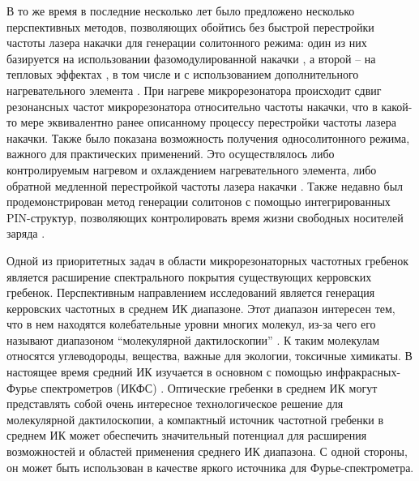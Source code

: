В то же время в последние несколько лет было предложено несколько перспективных методов, позволяющих обойтись без быстрой перестройки частоты лазера накачки для генерации солитонного режима: один из них базируется на использовании фазомодулированной накачки \cite{Taheri2015,Jang2015ol}, а второй – на тепловых эффектах \cite{Kobatake2016}, в том числе и с использованием дополнительного нагревательного элемента \cite{Joshi2016}. При нагреве микрорезонатора происходит сдвиг резонансных частот микрорезонатора относительно частоты накачки, что в какой-то мере эквивалентно ранее описанному процессу перестройки частоты лазера накачки. Также было показана возможность получения односолитонного режима, важного для практических применений. Это осуществлялось либо контролируемым нагревом и охлаждением нагревательного элемента, либо обратной медленной перестройкой частоты лазера накачки \cite{Karpov2017}. Также недавно был продемонстрирован метод генерации солитонов с помощью интегрированных PIN-структур, позволяющих контролировать время жизни свободных носителей заряда \cite{Yu2016}.

Одной из приоритетных задач в области микрорезонаторных частотных гребенок является расширение спектрального покрытия существующих керровских гребенок. Перспективным направлением исследований является генерация керровских частотных в среднем ИК диапазоне. Этот диапазон интересен тем, что в нем находятся колебательные уровни многих молекул, из-за чего его называют диапазоном “молекулярной дактилоскопии” \cite{Diddams2007}. К таким молекулам относятся углеводороды, вещества, важные для экологии, токсичные химикаты. В настоящее время средний ИК изучается в основном с помощью инфракрасных-Фурье спектрометров (ИКФС) \cite{Griffiths2006}. Оптические гребенки в среднем ИК могут представлять собой очень интересное технологическое решение для молекулярной дактилоскопии, а компактный источник частотной гребенки в среднем ИК может обеспечить значительный потенциал для расширения возможностей и областей применения среднего ИК диапазона. С одной стороны, он может быть использован в качестве яркого источника для Фурье-спектрометра. 

